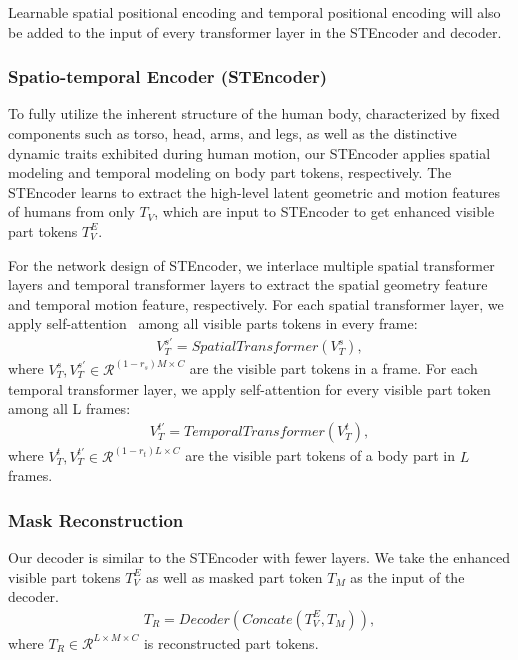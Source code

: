 Learnable spatial positional encoding and temporal positional encoding will also be added to the input of every transformer layer in the STEncoder and decoder. 


\subsubsection{Spatio-temporal Encoder (STEncoder)}

To fully utilize the inherent structure of the human body, characterized by fixed components such as torso, head, arms, and legs, as well as the distinctive dynamic traits exhibited during human motion, our STEncoder applies spatial modeling and temporal modeling on body part tokens, respectively.
The STEncoder learns to extract the high-level latent geometric and motion features of humans from only $T_V$, which are input to STEncoder to get enhanced visible part tokens $T_V^E$.

For the network design of STEncoder, we interlace multiple spatial transformer~\cite{vaswani2017attention} layers and temporal transformer layers to extract the spatial geometry feature and temporal motion feature, respectively. For each spatial transformer layer, we apply self-attention~\cite{vaswani2017attention} among all visible parts tokens in every frame:
\begin{equation}
    \begin{aligned}
    V^{s'}_T = SpatialTransformer(V^{s}_T),
    \end{aligned}
\end{equation}
where $V^{s}_T, V^{s'}_T \in \mathcal{R}^{(1-r_s)M \times C}$ are the visible part tokens in a frame. For each temporal transformer layer, we apply self-attention for every visible part token among all L frames:
\begin{equation}
    \begin{aligned}
    V^{t'}_T = TemporalTransformer(V^{t}_T),
    \end{aligned}
\end{equation}
where $V^{t}_T, V^{t'}_T \in \mathcal{R}^{(1-r_t)L\times C}$ are the visible part tokens of a body part in $L$ frames.

\subsubsection{Mask Reconstruction}
Our decoder is similar to the STEncoder with fewer layers. We take the enhanced visible part tokens $T_V^E$ as well as masked part token $T_M$ as the input of the decoder. 
\begin{equation}
    \begin{aligned}
    T_R = Decoder(Concate(T_V^E,T_M)),
    \end{aligned}
\end{equation}
where $T_R \in \mathcal{R}^{L \times M \times C}$ is reconstructed part tokens.


